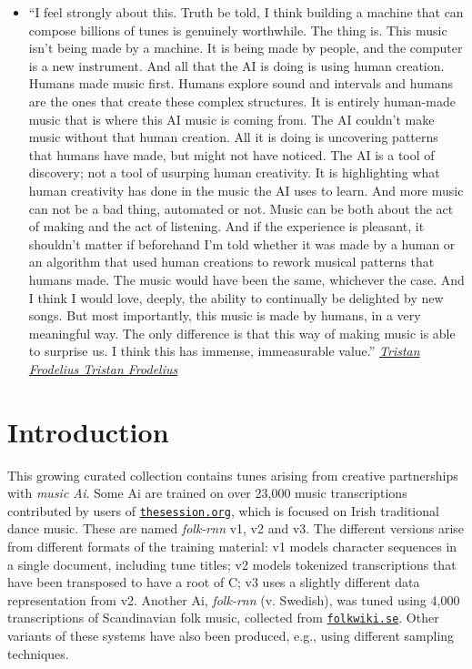\documentclass[a4paper,notitlepage,twoside]{book}
\begin{document}
\begin{itemize}
\item ``I feel strongly about this. Truth be told, I think building a machine that can compose billions of tunes is genuinely worthwhile. The thing is. This music isn't being made by a machine. It is being made by people, and the computer is a new instrument. And all that the AI is doing is using human creation. Humans made music first. Humans explore sound and intervals and humans are the ones that create these complex structures. It is entirely human-made music that is where this AI music is coming from. The AI couldn't make music without that human creation. All it is doing is uncovering patterns that humans have made, but might not have noticed. The AI is a tool of discovery; not a tool of usurping human creativity. It is highlighting what human creativity has done in the music the AI uses to learn. And more music can not be a bad thing, automated or not. Music can be both about the act of making and the act of listening. And if the experience is pleasant, it shouldn't matter if beforehand I'm told whether it was made by a human or an algorithm that used human creations to rework musical patterns that humans made. The music would have been the same, whichever the case. And I think I would love, deeply, the ability to continually be delighted by new songs. But most importantly, this music is made by humans, in a very meaningful way. The only difference is that this way of making music is able to surprise us. I think this has immense, immeasurable value.''  \href{https://youtu.be/KSoSyoEx6hc}{{\em Tristan Frodelius
Tristan Frodelius
}}
\end{itemize}

\tableofcontents
\mainmatter
\chapter{Introduction}
This growing curated collection contains tunes
arising from creative partnerships with {\em music Ai}. %
Some Ai are trained on over 23,000 music transcriptions 
contributed by users of \href{http://thesession.org}{\tt thesession.org},
which is focused on Irish traditional dance music.
These are named {\em folk-rnn} v1, v2 and v3. 
The different versions arise from
different formats of the training material:
v1 models character sequences in a single document, 
including tune titles;
v2 models tokenized transcriptions that have been transposed to 
have a root of C;
v3 uses a slightly different data representation from v2.
Another Ai, {\em folk-rnn} (v. Swedish), was tuned using 4,000 transcriptions of 
Scandinavian folk music, collected from \href{http://folkwiki.se}{\tt folkwiki.se}.
Other variants of these systems have also been produced,
e.g., using different sampling techniques.
\end{document}
